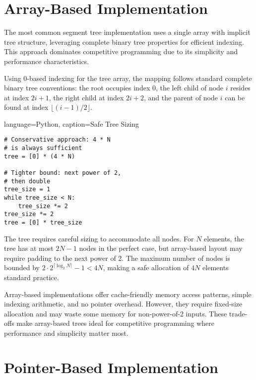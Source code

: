 \section{Array-Based Implementation}
\label{sec:array_based_layout}

The most common segment tree implementation uses a single array with implicit tree structure, leveraging complete binary tree properties for efficient indexing. This approach dominates competitive programming due to its simplicity and performance characteristics.

Using $0$-based indexing for the tree array, the mapping follows standard complete binary tree conventions: the root occupies index $0$, the left child of node $i$ resides at index $2i + 1$, the right child at index $2i + 2$, and the parent of node $i$ can be found at index $\lfloor(i-1)/2\rfloor$.

\begin{marginlisting}[0pt]{language=Python, caption=Safe Tree Sizing}
\begin{lstlisting}
# Conservative approach: 4 * N
# is always sufficient
tree = [0] * (4 * N)

# Tighter bound: next power of 2,
# then double
tree_size = 1
while tree_size < N:
    tree_size *= 2
tree_size *= 2
tree = [0] * tree_size
\end{lstlisting}
\end{marginlisting}

The tree requires careful sizing to accommodate all nodes. For $N$ elements, the tree has at most $2N-1$ nodes in the perfect case, but array-based layout may require padding to the next power of 2. The maximum number of nodes is bounded by $2 \cdot 2^{\lceil \log_2 N \rceil} - 1 < 4N$, making a safe allocation of $4N$ elements standard practice.

Array-based implementations offer cache-friendly memory access patterns, simple indexing arithmetic, and no pointer overhead. However, they require fixed-size allocation and may waste some memory for non-power-of-2 inputs. These trade-offs make array-based trees ideal for competitive programming where performance and simplicity matter most.

\section{Pointer-Based Implementation}
\label{sec:pointer_based_layout}

